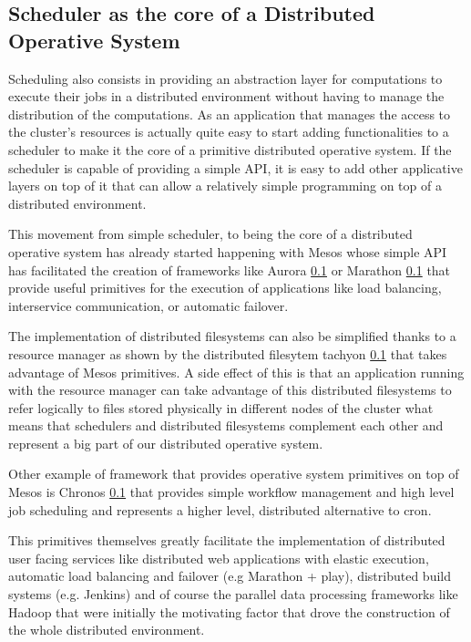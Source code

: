 \documentclass{svjour3}                     %
\begin{document}
\subsection{Scheduler as the core of a Distributed Operative System}

Scheduling also consists in providing an abstraction layer for
computations to execute their jobs in a distributed environment
without having to manage the distribution of the
computations. As an application that manages the access to
the cluster's resources is actually quite easy to start adding
functionalities to a scheduler to make it the core of a primitive
distributed operative system. If the scheduler is capable of providing
a simple API, it is easy to add other applicative layers on top of
it that can allow a relatively simple programming on top of a
distributed environment.

This movement from simple scheduler, to being the core of a distributed
operative system has already started happening with Mesos whose simple
API has facilitated the creation of frameworks like Aurora \ref{} or
Marathon \ref{} that provide useful primitives for the execution
of applications like load balancing, interservice communication,
or automatic failover.

The implementation of distributed filesystems can also be simplified
thanks to a resource manager as shown by the distributed filesytem
tachyon \ref{} that takes advantage of Mesos primitives. A side effect
of this is that an application running with the resource manager can
take advantage of this distributed filesystems to refer logically to
files stored physically in different nodes of the cluster what means
that schedulers and distributed filesystems complement each other and
represent a big part of our distributed operative system.

Other example of framework that provides operative system primitives
on top of Mesos is Chronos \ref{} that provides simple workflow
management and high level job scheduling and represents a higher
level, distributed alternative to cron.

This primitives themselves greatly facilitate the implementation of
distributed user facing services like distributed web applications
with elastic execution, automatic load balancing and failover (e.g
Marathon + play), distributed build systems (e.g. Jenkins) and of
course the parallel data processing frameworks like Hadoop that were
initially the motivating factor that drove the construction of the
whole distributed environment.
\end{document}
